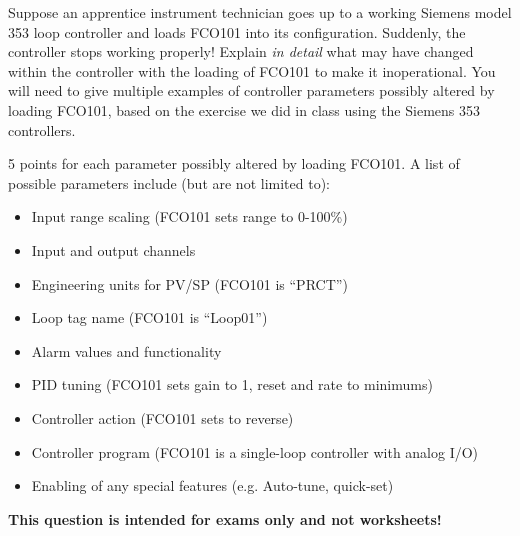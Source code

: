 

Suppose an apprentice instrument technician goes up to a working Siemens model 353 loop controller and loads FCO101 into its configuration.  Suddenly, the controller stops working properly!  Explain {\it in detail} what may have changed within the controller with the loading of FCO101 to make it inoperational.  You will need to give multiple examples of controller parameters possibly altered by loading FCO101, based on the exercise we did in class using the Siemens 353 controllers.

\vskip 100pt







5 points for each parameter possibly altered by loading FCO101.  A list of possible parameters include (but are not limited to):

\begin{itemize}
\item{} Input range scaling (FCO101 sets range to 0-100\%)
\item{} Input and output channels
\item{} Engineering units for PV/SP (FCO101 is ``PRCT'')
\item{} Loop tag name (FCO101 is ``Loop01'')
\item{} Alarm values and functionality
\item{} PID tuning (FCO101 sets gain to 1, reset and rate to minimums)
\item{} Controller action (FCO101 sets to reverse)
\item{} Controller program (FCO101 is a single-loop controller with analog I/O)
\item{} Enabling of any special features (e.g. Auto-tune, quick-set)
\end{itemize}







{\bf This question is intended for exams only and not worksheets!}



